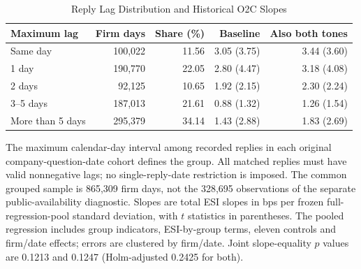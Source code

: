 \begin{table}[H]
\centering\footnotesize
\caption{Reply Lag Distribution and Historical O2C Slopes}\label{tab:lag_regressions}
\begin{threeparttable}
\renewcommand{\arraystretch}{1.12}
\begin{tabular*}{\textwidth}{@{\extracolsep{\fill}}lrrrr@{}}
\toprule
Maximum lag & Firm days & Share (\%) & Baseline & Also both tones \\
\midrule
Same day & 100,022 & 11.56 & 3.05 (3.75) & 3.44 (3.60) \\
1 day & 190,770 & 22.05 & 2.80 (4.47) & 3.18 (4.08) \\
2 days & 92,125 & 10.65 & 1.92 (2.15) & 2.30 (2.24) \\
3--5 days & 187,013 & 21.61 & 0.88 (1.32) & 1.26 (1.54) \\
More than 5 days & 295,379 & 34.14 & 1.43 (2.88) & 1.83 (2.69) \\
\bottomrule
\end{tabular*}
\begin{tablenoteblock}
The maximum calendar-day interval among recorded replies in each original company-question-date cohort defines the group. All matched replies must have valid nonnegative lags; no single-reply-date restriction is imposed. The common grouped sample is 865,309 firm days, not the 328,695 observations of the separate public-availability diagnostic. Slopes are total ESI slopes in bps per frozen full-regression-pool standard deviation, with $t$ statistics in parentheses. The pooled regression includes group indicators, ESI-by-group terms, eleven controls and firm/date effects; errors are clustered by firm/date. Joint slope-equality $p$ values are 0.1213 and 0.1247 (Holm-adjusted 0.2425 for both).
\end{tablenoteblock}
\end{threeparttable}
\end{table}
